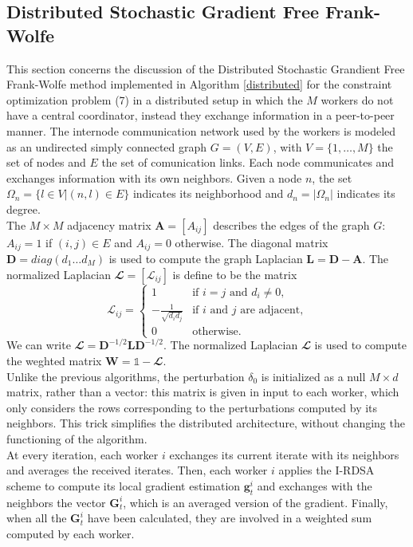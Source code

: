 \subsection{Distributed Stochastic Gradient Free Frank-Wolfe}
This section concerns the discussion of the Distributed Stochastic Grandient Free Frank-Wolfe method implemented in Algorithm \ref{distributed} for the constraint optimization problem (7) in a distributed setup in which the $M$ workers do not have a central coordinator, instead they exchange information in a peer-to-peer manner. The internode communication network used by the workers is modeled as an undirected simply connected graph $G=(V,E)$, with $V=\{1, \dots, M\}$ the set of nodes and $E$ the set of comunication links. Each node communicates and exchanges information with its own neighbors. Given a node $n$, the set $\Omega_n = \{l \in V | (n,l)\in E\}$ indicates its neighborhood and $d_n = |\Omega_n|$ indicates its degree.\\ \indent The $M \times M$ adjacency matrix $\mathbf{A}=[A_{ij}]$ describes the edges of the graph $G$: $A_{ij}=1$ if $(i,j) \in E$ and $A_{ij}=0$ otherwise. The diagonal matrix $\mathbf{D}=diag(d_1 \dots d_M)$ is used to compute the graph Laplacian $\mathbf{L}=\mathbf{D}-\mathbf{A}$. The normalized Laplacian $\mathbfcal{L} = [\mathcal{L}_{ij}]$ is define to be the matrix
\[
\mathcal{L}_{ij}=
\begin{cases}
	1 & \text{if $i=j$ and }d_i\ne0, \\
	-\frac{1}{\sqrt{d_id_j}} & \text{if $i$ and $j$ are adjacent,}\\
	0 & \text{otherwise.}
	
\end{cases}
\]
We can write $\mathbfcal{L} = \mathbf{D}^{-1/2}\mathbf{L}\mathbf{D}^{-1/2}$. The normalized Laplacian $\mathbfcal{L}$ is used to compute the weghted matrix $\mathbf{W} = \mathbb{1}- \mathbfcal{L}$.\\
\indent Unlike the previous algorithms, the perturbation \mbox{\boldmath$ \delta$}$_0$ is initialized as a null $M \times d$ matrix, rather than a vector: this matrix is given in input to each worker, which only considers the rows corresponding to the perturbations computed by its neighbors. This trick simplifies the distributed architecture, without changing the functioning of the algorithm.\\
\indent At every iteration, each worker $i$ exchanges its current iterate with its neighbors and averages the received iterates. Then, each worker $i$ applies the I-RDSA scheme to compute its local gradient estimation $\mathbf{g}_t^i$ and exchanges with the neighbors the vector $\mathbf{G}_t^i$, which is an averaged version of the gradient. Finally, when all the $\mathbf{G}_t^i$ have been calculated, they are involved in a weighted sum computed by each worker.\\
